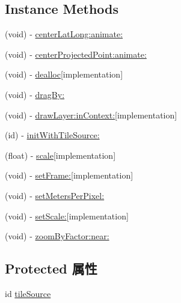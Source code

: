 \subsection*{Instance Methods}
\begin{DoxyCompactItemize}
\item 
(void) -\/ \hyperlink{interface_r_m_tiled_layer_controller_ac3e2b55de10107a99874345c9dbf62de}{center\-Lat\-Long\-:animate\-:}
\item 
(void) -\/ \hyperlink{interface_r_m_tiled_layer_controller_afcbf7ae92f33d17d1092b76a65473132}{center\-Projected\-Point\-:animate\-:}
\item 
(void) -\/ \hyperlink{interface_r_m_tiled_layer_controller_a3d1cfda58c558b31953f730038834d52}{dealloc}{\ttfamily  \mbox{[}implementation\mbox{]}}
\item 
(void) -\/ \hyperlink{interface_r_m_tiled_layer_controller_a741213ebae66d18d865847d843a45e20}{drag\-By\-:}
\item 
(void) -\/ \hyperlink{interface_r_m_tiled_layer_controller_aece5748f795a9354647832035eebec78}{draw\-Layer\-:in\-Context\-:}{\ttfamily  \mbox{[}implementation\mbox{]}}
\item 
(id) -\/ \hyperlink{interface_r_m_tiled_layer_controller_abd10bf280322090e7dd85205efcad4d3}{init\-With\-Tile\-Source\-:}
\item 
(float) -\/ \hyperlink{interface_r_m_tiled_layer_controller_af8c560996e26ac294d025a08bf333ade}{scale}{\ttfamily  \mbox{[}implementation\mbox{]}}
\item 
(void) -\/ \hyperlink{interface_r_m_tiled_layer_controller_ac66ae3222b62950c4b3984eac7ee69ba}{set\-Frame\-:}{\ttfamily  \mbox{[}implementation\mbox{]}}
\item 
(void) -\/ \hyperlink{interface_r_m_tiled_layer_controller_acab060aac333081e8c7d9485301edf0f}{set\-Meters\-Per\-Pixel\-:}
\item 
(void) -\/ \hyperlink{interface_r_m_tiled_layer_controller_a86887d8626b3e41e2a4307c6c8c104d9}{set\-Scale\-:}{\ttfamily  \mbox{[}implementation\mbox{]}}
\item 
(void) -\/ \hyperlink{interface_r_m_tiled_layer_controller_a3f661493d2309c08213482e3b292dcbe}{zoom\-By\-Factor\-:near\-:}
\end{DoxyCompactItemize}
\subsection*{Protected 属性}
\begin{DoxyCompactItemize}
\item 
id \hyperlink{interface_r_m_tiled_layer_controller_a6c6f59eef3021b7596345bb255bea782}{tile\-Source}
\end{DoxyCompactItemize}
